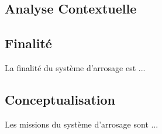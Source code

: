 \textcolor[RGB]{46, 116, 181}{\chapter{Analyse Contextuelle}}

\section{Finalité}
La finalité du système d'arrosage est ...

\section{Conceptualisation}
Les missions du système d'arrosage sont ...
